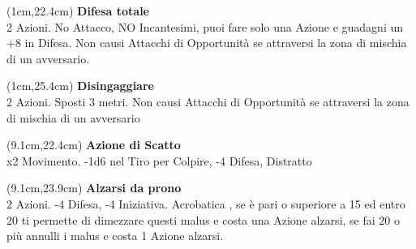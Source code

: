 \documentclass[a4paper,12 pt,openany]{book}
\begin{document}

\begin{textblock*}{8cm}(1cm,22.4cm) %
\textbf{Difesa totale}\\
2 Azioni. No Attacco, NO Incantesimi, puoi fare solo una Azione e guadagni un +8 in Difesa. Non causi Attacchi di Opportunità se attraversi la zona di mischia di un avversario.
\end{textblock*}

\begin{textblock*}{8cm}(1cm,25.4cm) %
\textbf{Disingaggiare}\\
2 Azioni. Sposti 3 metri. Non causi Attacchi di Opportunità se attraversi la zona di mischia di un avversario
\end{textblock*}



\begin{textblock*}{6.9cm}(9.1cm,22.4cm) %
\textbf{Azione di Scatto}\\
x2 Movimento. -1d6 nel Tiro per Colpire, -4 Difesa, Distratto
\end{textblock*}

\begin{textblock*}{6.9cm}(9.1cm,23.9cm) %
\textbf{Alzarsi da prono}\\
2 Azioni. -4 Difesa, -4 Iniziativa. Acrobatica , se è pari o superiore a 15 ed entro 20 ti permette di dimezzare questi malus e costa una Azione alzarsi,
se fai 20 o più annulli i malus e costa 1 Azione alzarsi.
\end{textblock*}


	
	~\newpage
	
\end{document}
